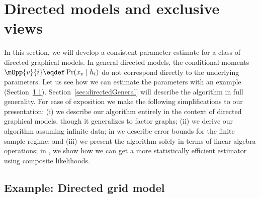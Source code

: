 \section{Directed models and exclusive views}
\label{sec:directed}


  In this section, we will develop a consistent parameter estimate for a class of directed graphical models.
  In general directed models, the conditional moments $\mOpp{v}{i} \eqdef \Pr(x_v \mid h_i)$
  do not correspond directly to the underlying parameters.
  Let us see how we can estimate the parameters with an example (Section~\ref{sec:directedExample}).
  Section~\ref{sec:directedGeneral} will describe the algorithm in full generality.
For ease of exposition we make the following simplifications to our presentation:
(i) we describe our algorithm entirely in the context of directed
  graphical models, though it generalizes to factor graphs;
(ii) we derive our algorithm assuming infinite data; in  we 
  describe error bounds for the finite sample regime; and
(iii) we present the algorithm solely in terms of linear algebra operations; in
  , we show how we can get a more statistically
  efficient estimator using composite likelihoods.

\subsection{Example: Directed grid model}
\label{sec:directedExample}

%  

